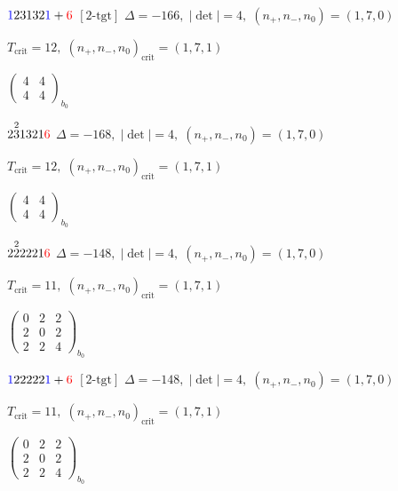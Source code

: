 \documentclass[10pt]{article}
\begin{document}
\smallskip

$\textcolor{blue}{1}23132\textcolor{blue}{1}+\textcolor{red}{6}$ $\scriptstyle [2\text{-tgt}]$ \quad $\Delta=-166,\; |\det|=4,\; (n_+,n_-,n_0)=(1,7,0)$

\hspace{1em}$T_{\text{crit}}=12,\; (n_+,n_-,n_0)_{\text{crit}}=(1,7,1)$

\hspace{2em}$\left(\begin{smallmatrix}4 & 4 \\ 4 & 4\end{smallmatrix}\right)_{\!b_0}$

\smallskip

$2\overset{2}{3}1321\textcolor{red}{6}$ \quad $\Delta=-168,\; |\det|=4,\; (n_+,n_-,n_0)=(1,7,0)$

\hspace{1em}$T_{\text{crit}}=12,\; (n_+,n_-,n_0)_{\text{crit}}=(1,7,1)$

\hspace{2em}$\left(\begin{smallmatrix}4 & 4 \\ 4 & 4\end{smallmatrix}\right)_{\!b_0}$

\smallskip

$2\overset{2}{2}2221\textcolor{red}{6}$ \quad $\Delta=-148,\; |\det|=4,\; (n_+,n_-,n_0)=(1,7,0)$

\hspace{1em}$T_{\text{crit}}=11,\; (n_+,n_-,n_0)_{\text{crit}}=(1,7,1)$

\hspace{2em}$\left(\begin{smallmatrix}0 & 2 & 2 \\ 2 & 0 & 2 \\ 2 & 2 & 4\end{smallmatrix}\right)_{\!b_0}$

\smallskip

$\textcolor{blue}{1}22222\textcolor{blue}{1}+\textcolor{red}{6}$ $\scriptstyle [2\text{-tgt}]$ \quad $\Delta=-148,\; |\det|=4,\; (n_+,n_-,n_0)=(1,7,0)$

\hspace{1em}$T_{\text{crit}}=11,\; (n_+,n_-,n_0)_{\text{crit}}=(1,7,1)$

\hspace{2em}$\left(\begin{smallmatrix}0 & 2 & 2 \\ 2 & 0 & 2 \\ 2 & 2 & 4\end{smallmatrix}\right)_{\!b_0}$
\end{document}
